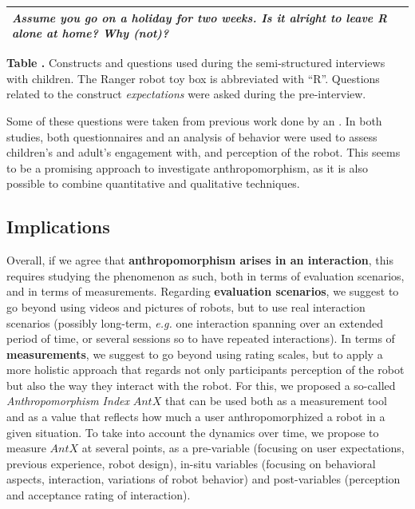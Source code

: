 \documentclass{frontiersSCNS} %
\newcommand{\eg}{\textit{e.g.}\xspace}
\begin{document}
\begin{table}
\begin{tabular}{lp{10cm}}
    \emph{Assume you go on a holiday for two weeks. Is it alright to leave R
    alone at home? Why (not)?}
    \\
    \bottomrule

    \end{tabular}

    \textbf{\label{tab:domino-questions}Table .} Constructs and questions used during the semi-structured interviews
    with children. The Ranger robot toy box is abbreviated with ``R''. Questions
    related to the construct \emph{expectations} were asked during the
    pre-interview.

     

\end{table}

Some of these questions were taken from previous work done by
\cite{kahn_jr._robotic_2006} an \cite{weiss_i_2009}. In both studies, both
questionnaires and an analysis of behavior were used to assess children's and
adult's engagement with, and perception of the robot. This seems to be a
promising approach to investigate anthropomorphism, as it is also possible to
combine quantitative and qualitative techniques. 

\subsection{Implications}

Overall, if we agree that \textbf{anthropomorphism arises in an interaction}, this requires studying the phenomenon as such, both in terms of evaluation scenarios, and in terms of measurements. Regarding \textbf{evaluation scenarios}, we suggest to go beyond using videos and pictures of robots, but to use real interaction scenarios (possibly long-term, \eg one interaction spanning over an extended period of time, or several sessions so to have repeated interactions). In terms of \textbf{measurements}, we suggest to go beyond using rating scales, but to apply a more holistic approach that regards not only participants perception of the robot but also the way they interact with the robot. For this, we proposed a so-called \textit{Anthropomorphism Index} $AntX$ that can be used both as a measurement tool and as a value that reflects how much a user anthropomorphized a robot in a given situation. To take into account the dynamics over time, we propose to measure $AntX$ at several points, as a pre-variable (focusing on user expectations, previous experience, robot design), in-situ variables (focusing on behavioral aspects, interaction, variations of robot behavior) and post-variables (perception and acceptance rating of interaction).  
\end{document}
